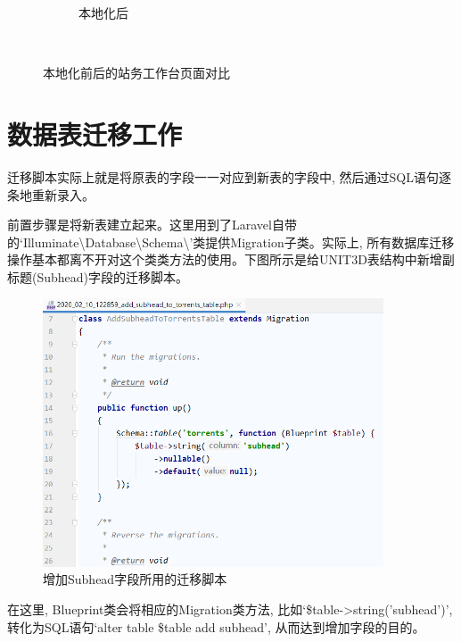 \begin{figure}[h]
\begin{subfigure}{0.3\textwidth}
        \caption{本地化后}
        \label{fig:afterlocal}
    \end{subfigure} \\
    \caption{本地化前后的站务工作台页面对比}
    \label{fig:guidifflocal}
\end{figure}



\section{数据表迁移工作}
\label{sec:migration}

迁移脚本实际上就是将原表的字段一一对应到新表的字段中, 然后通过SQL语句逐条地重新录入。

前置步骤是将新表建立起来。这里用到了Laravel自带的`Illuminate\textbackslash Database\textbackslash Sche\-ma\textbackslash'类提供Migration子类。实际上, 所有数据库迁移操作基本都离不开对这个类类方法的使用。下图所示是给UNIT3D表结构中新增副标题(Subhead)字段的迁移脚本。

\begin{figure}[ht]
    \centering
    \includegraphics[width=0.9\textwidth]{support-files/4.3-subhead-migration-script.png}
    \caption{增加Subhead字段所用的迁移脚本}
    \label{fig:subheadmigratescript}
\end{figure}


在这里, Blueprint类会将相应的Migration类方法, 比如`\$table->string('subhead')', 转化为SQL语句`alter table \$table add subhead', 从而达到增加字段的目的。

